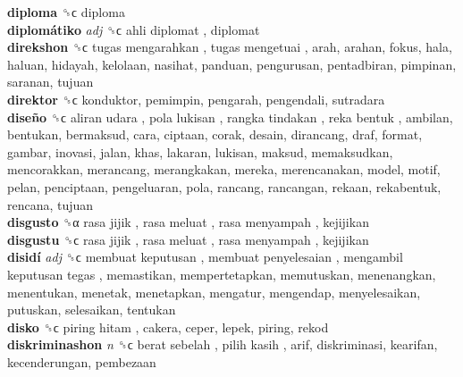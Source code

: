 \textbf{diploma} ␝ϲ  diploma  \\
\textbf{diplomátiko} \emph{adj}  ␝ϲ   ahli diplomat , diplomat  \\
\textbf{direkshon} ␝ϲ   tugas mengarahkan ,  tugas mengetuai , arah, arahan, fokus, hala, haluan, hidayah, kelolaan, nasihat, panduan, pengurusan, pentadbiran, pimpinan, saranan, tujuan  \\
\textbf{direktor} ␝ϲ  konduktor, pemimpin, pengarah, pengendali, sutradara  \\
\textbf{diseño} ␝ϲ   aliran udara ,  pola lukisan ,  rangka tindakan ,  reka bentuk , ambilan, bentukan, bermaksud, cara, ciptaan, corak, desain, dirancang, draf, format, gambar, inovasi, jalan, khas, lakaran, lukisan, maksud, memaksudkan, mencorakkan, merancang, merangkakan, mereka, merencanakan, model, motif, pelan, penciptaan, pengeluaran, pola, rancang, rancangan, rekaan, rekabentuk, rencana, tujuan  \\
\textbf{disgusto} ␝α   rasa jijik ,  rasa meluat ,  rasa menyampah , kejijikan  \\
\textbf{disgustu} ␝ϲ   rasa jijik ,  rasa meluat ,  rasa menyampah , kejijikan  \\
\textbf{disidí} \emph{adj}  ␝ϲ   membuat keputusan ,  membuat penyelesaian ,  mengambil keputusan tegas , memastikan, mempertetapkan, memutuskan, menenangkan, menentukan, menetak, menetapkan, mengatur, mengendap, menyelesaikan, putuskan, selesaikan, tentukan  \\
\textbf{disko} ␝ϲ   piring hitam , cakera, ceper, lepek, piring, rekod  \\
\textbf{diskriminashon} \emph{n}  ␝ϲ   berat sebelah ,  pilih kasih , arif, diskriminasi, kearifan, kecenderungan, pembezaan  \\
